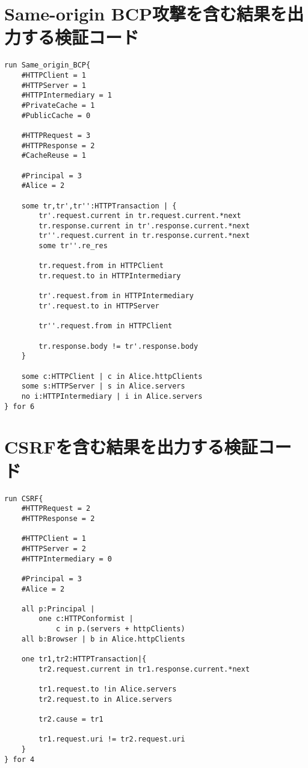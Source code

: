 \documentclass[journal]{IEEEtran}
\begin{document}
\section{Same-origin BCP攻撃を含む結果を出力する検証コード}

\begin{lstlisting}[caption=Same-origin BCP攻撃の表現, label=code:Same_origin_BCP]
run Same_origin_BCP{
	#HTTPClient = 1
	#HTTPServer = 1
	#HTTPIntermediary = 1
	#PrivateCache = 1
	#PublicCache = 0

	#HTTPRequest = 3
	#HTTPResponse = 2
	#CacheReuse = 1

	#Principal = 3
	#Alice = 2

	some tr,tr',tr'':HTTPTransaction | {
		tr'.request.current in tr.request.current.*next
		tr.response.current in tr'.response.current.*next
		tr''.request.current in tr.response.current.*next
		some tr''.re_res

		tr.request.from in HTTPClient
		tr.request.to in HTTPIntermediary

		tr'.request.from in HTTPIntermediary
		tr'.request.to in HTTPServer

		tr''.request.from in HTTPClient

		tr.response.body != tr'.response.body
	}

	some c:HTTPClient | c in Alice.httpClients
	some s:HTTPServer | s in Alice.servers
	no i:HTTPIntermediary | i in Alice.servers
} for 6
\end{lstlisting}

\section{CSRFを含む結果を出力する検証コード}

\begin{lstlisting}[caption=CSRF攻撃の表現, label=code:CSRF]
run CSRF{
	#HTTPRequest = 2
	#HTTPResponse = 2

	#HTTPClient = 1
	#HTTPServer = 2
	#HTTPIntermediary = 0

	#Principal = 3
	#Alice = 2

	all p:Principal |
		one c:HTTPConformist |
			c in p.(servers + httpClients)
	all b:Browser | b in Alice.httpClients

	one tr1,tr2:HTTPTransaction|{
		tr2.request.current in tr1.response.current.*next

		tr1.request.to !in Alice.servers
		tr2.request.to in Alice.servers

		tr2.cause = tr1

		tr1.request.uri != tr2.request.uri
	}
} for 4
\end{lstlisting}
\end{document}
